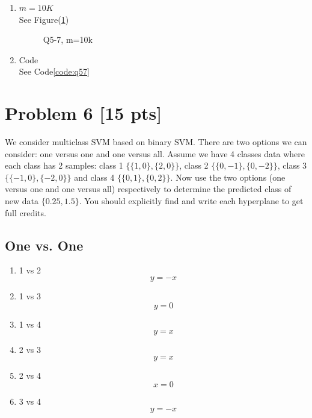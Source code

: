 \documentclass[11pt]{article}
\begin{document}
\begin{enumerate}
\begin{enumerate}
			\item $m=10K$\\
			See Figure(\ref{fig:q5710k})
			\begin{figure}[h]
				\centering
				\caption{Q5-7, m=10k }\label{fig:q5710k}
			  \end{figure} 

			\item Code\\
			See Code\ref{code:q57}
		\end{enumerate}

\end{enumerate}

\newpage
\section{Problem 6 [15 pts]}
We consider multiclass SVM based on binary SVM. There are two options we can consider: one versus one and one versus all. Assume we have 4 classes data where each class has 2 samples: class 1 $\{\{1,0\},\{2,0\}\}$, class 2 $\{\{0,-1\},\{0,-2\}\}$, class 3 $\{\{-1,0\},\{-2,0\}\}$ and class 4 $\{\{0,1\},\{0,2\}\}$. Now use the two options (one versus one and one versus all) respectively to determine the predicted class of new data $\{0.25,1.5\}$. You should explicitly find and write each hyperplane to get full credits.
\subsection{One vs. One}
\begin{enumerate}
	\item 1 vs 2
	$$y=-x$$
	\item 1 vs 3
	$$y=0$$
	\item 1 vs 4
	$$y=x$$
	\item 2 vs 3
	$$y=x$$
	\item 2 vs 4
	$$x=0$$
	\item 3 vs 4
	$$y=-x$$
\end{enumerate}
\end{document}
